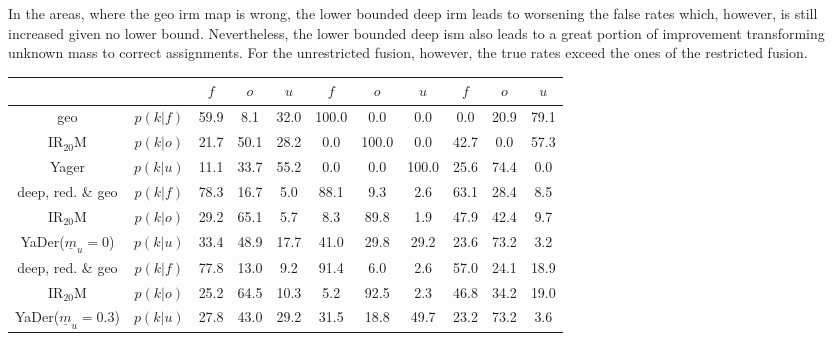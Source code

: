 \\\\
In the areas, where the geo \gls{irm} map is wrong, the lower bounded deep \gls{irm} leads to worsening the false rates which, however, is still increased given no lower bound. Nevertheless, the lower bounded deep \gls{ism} also leads to a great portion of improvement transforming unknown mass to correct assignments. For the unrestricted fusion, however, the true rates exceed the ones of the restricted fusion. 
\begin{center}
\begin{tabular}{c|c|ccc|ccc|ccc}
	&\backslashbox{}{\scriptsize{$k$}} & $f$ & $o$ & $u$ & $f$ & $o$ & $u$ & $f$ & $o$ & $u$\\
\hline
	geo&$p(k|f)$ & \textcolor{mygreen}{59.9} & \textcolor{myred}{8.1} & 32.0& \textcolor{mygreen}{100.0} & \textcolor{myred}{0.0} & 0.0& \textcolor{mygreen}{0.0} & \textcolor{myred}{20.9} & 79.1 \\
	IR$_{20}$M&$p(k|o)$ & \textcolor{myred}{21.7} & \textcolor{mygreen}{50.1} & 28.2& \textcolor{myred}{0.0} & \textcolor{mygreen}{100.0} & 0.0& \textcolor{myred}{42.7} & \textcolor{mygreen}{0.0} & 57.3 \\
	Yager&$p(k|u)$ & 11.1 & 33.7 & 55.2& 0.0 & 0.0 & 100.0& 25.6 & 74.4 & 0.0 \\
\hline
	deep, red. \& geo &$p(k|f)$ & \textcolor{mygreen}{78.3} & \textcolor{myred}{16.7} & 5.0& \textcolor{mygreen}{88.1} & \textcolor{myred}{9.3} & 2.6& \textcolor{mygreen}{63.1} & \textcolor{myred}{28.4} & 8.5 \\
	IR$_{20}$M&$p(k|o)$ & \textcolor{myred}{29.2} & \textcolor{mygreen}{65.1} & 5.7& \textcolor{myred}{8.3} & \textcolor{mygreen}{89.8} & 1.9& \textcolor{myred}{47.9} & \textcolor{mygreen}{42.4} & 9.7 \\
	YaDer($\underline{m}_u = 0$)&$p(k|u)$ & 33.4 & 48.9 & 17.7& 41.0 & 29.8 & 29.2& 23.6 & 73.2 & 3.2 \\
\hline
	deep, red. \& geo &$p(k|f)$ & \textcolor{mygreen}{77.8} & \textcolor{myred}{13.0} & 9.2& \textcolor{mygreen}{91.4} & \textcolor{myred}{6.0} & 2.6& \textcolor{mygreen}{57.0} & \textcolor{myred}{24.1} & 18.9 \\
	IR$_{20}$M&$p(k|o)$ & \textcolor{myred}{25.2} & \textcolor{mygreen}{64.5} & 10.3& \textcolor{myred}{5.2} & \textcolor{mygreen}{92.5} & 2.3& \textcolor{myred}{46.8} & \textcolor{mygreen}{34.2} & 19.0 \\
	YaDer($\underline{m}_u = 0.3$)&$p(k|u)$ & 27.8 & 43.0 & 29.2& 31.5 & 18.8 & 49.7& 23.2 & 73.2 & 3.6 \\

\end{tabular}
\end{center}
